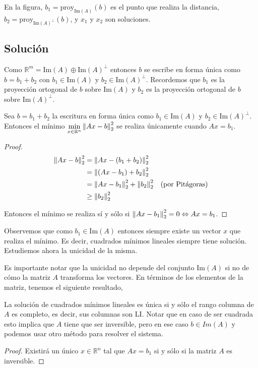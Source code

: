 En la figura, $b_1 = \text{proy}_{\text{Im}(A)}(b)$ es el punto que realiza la distancia, $b_2 = \text{proy}_{\text{Im}(A)^{\perp}}(b)$, y $x_1$ y $x_2$ son soluciones.

\subsection{Solución}

Como $\mathbb{R}^m = \text{Im}(A) \oplus \text{Im}(A)^{\perp}$ entonces $b$ se escribe en forma única como $b = b_1 + b_2$ con $b_1 \in \text{Im}(A)$ y $b_2 \in \text{Im}(A)^{\perp}$. Recordemos que $b_1$ es la proyección ortogonal de $b$ sobre $\text{Im}(A)$ y $b_2$ es la proyección ortogonal de $b$ sobre $\text{Im}(A)^{\perp}$.

\begin{propo}
Sea $b = b_1 + b_2$ la escritura en forma única como $b_1 \in \text{Im}(A)$ y $b_2 \in \text{Im}(A)^{\perp}$. Entonces el mínimo $\min\limits_{x \in  \mathbb{R}^n}\left\lVert Ax - b\right\rVert_2^2$ se realiza únicamente cuando $Ax = b_1$.

\begin{proof}
\begin{align*}
\left\lVert Ax - b\right\rVert_2^2 &= \left\lVert Ax - (b_1 + b_2)\right\rVert_2^2				&\\
				&= \left\lVert(Ax - b_1) + b_2\right\rVert_2^2				&\\
				&= \left\lVert Ax - b_1\right\rVert_2^2 + \left\lVert b_2\right\rVert_2^2		&\text{(por Pitágoras)}\\
				&\geq \left\lVert b_2\right\rVert_2^2
\end{align*}

Entonces el mínimo se realiza sí y sólo si $\left\lVert Ax - b_1\right\rVert_2^2 = 0 \Leftrightarrow Ax = b_1$.

\end{proof}
\end{propo}

Observemos que como $b_1 \in \text{Im}(A)$ entonces siempre existe un vector $x$ que realiza el mínimo. Es decir, cuadrados mínimos lineales siempre tiene solución. Estudiemos ahora la unicidad de la misma.

Es importante notar que la unicidad no depende del conjunto $\text{Im}(A)$ si no de cómo la matriz $A$ transforma los vectores. En términos de los elementos de la matriz, tenemos el siguiente resultado,

\begin{propo}
La solución de cuadrados mínimos lineales es única si y sólo el rango columna de $A$ es completo, es decir, sus columnas son LI. Notar que en caso de ser cuadrada esto implica que $A$ tiene que ser inversible, pero en ese caso $b \in Im(A)$ y podemos usar otro método para resolver el sistema.

\begin{proof}
Existirá un único $x \in \mathbb{R}^n$ tal que $Ax = b_1$ si y sólo si la matriz $A$ es inversible.
\end{proof}
\end{propo}

